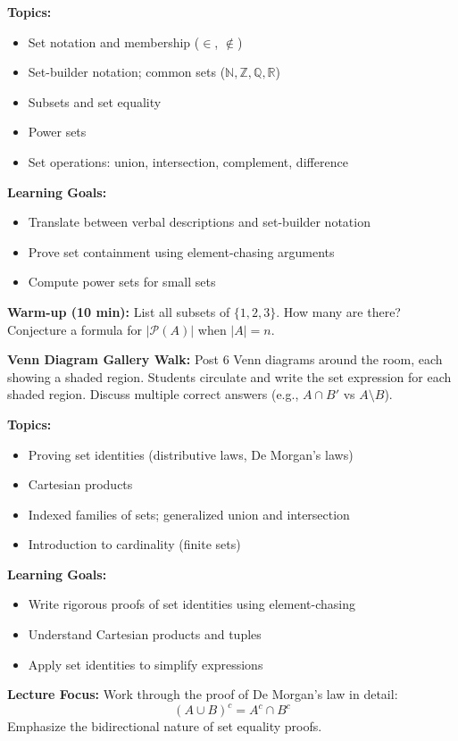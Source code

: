 \documentclass[11pt]{article}
\begin{document}
\begin{classabox}
\textbf{Topics:}
\begin{itemize}
    \item Set notation and membership ($\in$, $\notin$)
    \item Set-builder notation; common sets ($\mathbb{N}, \mathbb{Z}, \mathbb{Q}, \mathbb{R}$)
    \item Subsets and set equality
    \item Power sets
    \item Set operations: union, intersection, complement, difference
\end{itemize}

\textbf{Learning Goals:}
\begin{itemize}
    \item Translate between verbal descriptions and set-builder notation
    \item Prove set containment using element-chasing arguments
    \item Compute power sets for small sets
\end{itemize}

\textbf{Warm-up (10 min):} List all subsets of $\{1, 2, 3\}$. How many are there? Conjecture a formula for $|\mathcal{P}(A)|$ when $|A| = n$.
\end{classabox}

\begin{activitybox}
\textbf{Venn Diagram Gallery Walk:} Post 6 Venn diagrams around the room, each showing a shaded region. Students circulate and write the set expression for each shaded region. Discuss multiple correct answers (e.g., $A \cap B'$ vs $A \setminus B$).
\end{activitybox}

\begin{classbbox}
\textbf{Topics:}
\begin{itemize}
    \item Proving set identities (distributive laws, De Morgan's laws)
    \item Cartesian products
    \item Indexed families of sets; generalized union and intersection
    \item Introduction to cardinality (finite sets)
\end{itemize}

\textbf{Learning Goals:}
\begin{itemize}
    \item Write rigorous proofs of set identities using element-chasing
    \item Understand Cartesian products and tuples
    \item Apply set identities to simplify expressions
\end{itemize}

\textbf{Lecture Focus:} Work through the proof of De Morgan's law in detail:
\[
(A \cup B)^c = A^c \cap B^c
\]
Emphasize the bidirectional nature of set equality proofs.
\end{classbbox}
\end{document}
